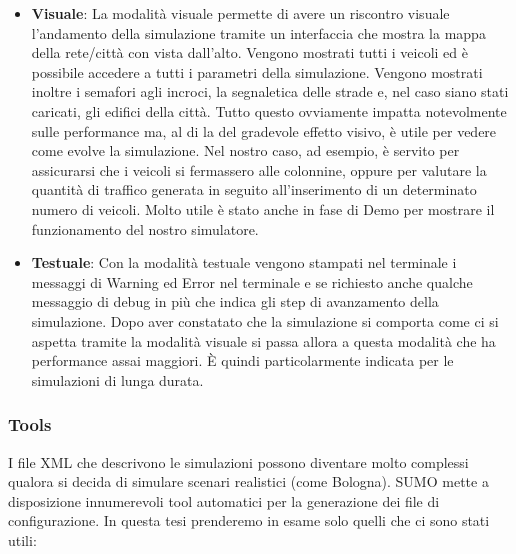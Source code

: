 \begin{itemize}
	\item \textbf{Visuale}: La modalità visuale permette di avere un riscontro visuale l'andamento della simulazione tramite un interfaccia che mostra la mappa della rete/città con vista dall'alto. Vengono mostrati tutti i veicoli ed è possibile accedere a tutti i parametri della simulazione. Vengono mostrati inoltre i semafori agli incroci, la segnaletica delle strade e, nel caso siano stati caricati, gli edifici della città. Tutto questo ovviamente impatta notevolmente sulle performance ma, al di la del gradevole effetto visivo, è utile per vedere come evolve la simulazione. Nel nostro caso, ad esempio, è servito per assicurarsi che i veicoli si fermassero alle colonnine, oppure per valutare la quantità di traffico generata in seguito all'inserimento di un determinato numero di veicoli. Molto utile è stato anche in fase di Demo per mostrare il funzionamento del nostro simulatore.
		
	\item \textbf{Testuale}: Con la modalità testuale vengono stampati nel terminale i messaggi di Warning ed Error nel terminale e se richiesto anche qualche messaggio di debug in più che indica gli step di avanzamento della simulazione. Dopo aver constatato che la simulazione si comporta come ci si aspetta tramite la modalità visuale si passa allora a questa modalità che ha performance assai maggiori. È quindi particolarmente indicata per le simulazioni di lunga durata.
\end{itemize}

\subsubsection{Tools}\label{sumo-tools}

I file XML che descrivono le simulazioni possono diventare molto complessi qualora si decida di simulare scenari realistici (come Bologna). SUMO mette a disposizione innumerevoli tool automatici per la generazione dei file di configurazione.  In questa tesi prenderemo in esame solo quelli che ci sono stati utili:

